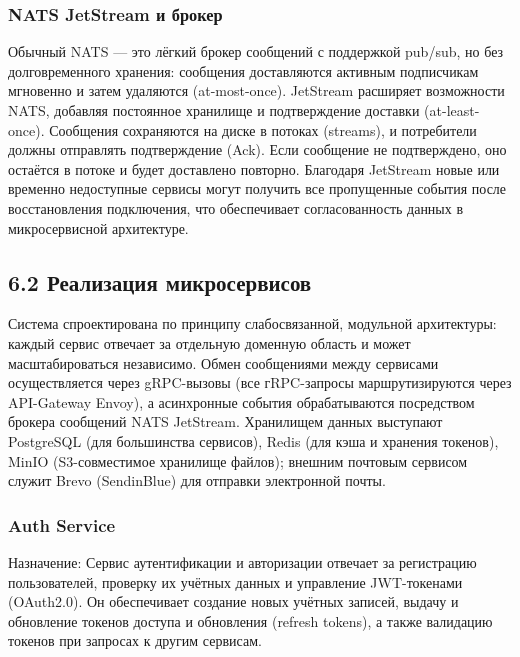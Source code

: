 \subsubsection*{NATS JetStream и брокер}

Обычный NATS — это лёгкий брокер сообщений с поддержкой pub/sub, но без долговременного хранения: сообщения доставляются активным подписчикам мгновенно и затем удаляются (at-most-once). JetStream расширяет возможности NATS, добавляя постоянное хранилище и подтверждение доставки (at-least-once). Сообщения сохраняются на диске в потоках (streams), и потребители должны отправлять подтверждение (Ack). Если сообщение не подтверждено, оно остаётся в потоке и будет доставлено повторно. Благодаря JetStream новые или временно недоступные сервисы могут получить все пропущенные события после восстановления подключения, что обеспечивает согласованность данных в микросервисной архитектуре.

\subsection*{6.2 Реализация микросервисов}

Система спроектирована по принципу слабосвязанной, модульной архитектуры: каждый сервис отвечает за отдельную доменную область и может масштабироваться независимо. Обмен сообщениями между сервисами осуществляется через gRPC-вызовы (все гRPC-запросы маршрутизируются через API-Gateway Envoy), а асинхронные события обрабатываются посредством брокера сообщений NATS JetStream. Хранилищем данных выступают PostgreSQL (для большинства сервисов), Redis (для кэша и хранения токенов), MinIO (S3-совместимое хранилище файлов); внешним почтовым сервисом служит Brevo (SendinBlue) для отправки электронной почты.

\subsubsection*{Auth Service}
Назначение: Сервис аутентификации и авторизации отвечает за регистрацию пользователей, проверку их учётных данных и управление JWT-токенами (OAuth2.0). Он обеспечивает создание новых учётных записей, выдачу и обновление токенов доступа и обновления (refresh tokens), а также валидацию токенов при запросах к другим сервисам.

